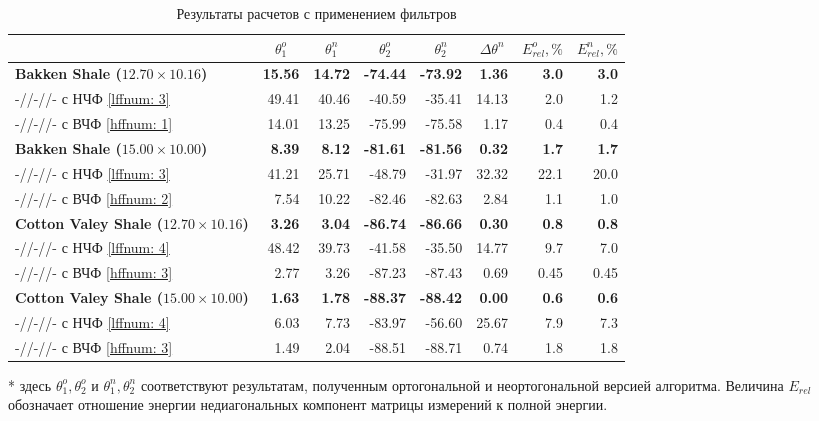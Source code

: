 \documentclass[a4paper,11pt]{article}
\begin{document}
\begin{table}[h]
\footnotesize
\centering
\caption{Результаты расчетов с применением фильтров}
\renewcommand{\arraystretch}{1.5}
\begin{tabularx}{\textwidth}{|X|rr|rr|r|rr|}
\hline
				&\multicolumn{1}{c}{$\theta_1^o$} & \multicolumn{1}{c|}{$\theta_1^n$} & \multicolumn{1}{c}{$\theta_2^o$} & \multicolumn{1}{c|}{$\theta_2^n$} & \multicolumn{1}{c|}{$\Delta\theta^n$}& \multicolumn{1}{c}{$E_{rel}^o, \%$} & \multicolumn{1}{c|}{$E_{rel}^n, \%$} \\ \hline
\hline	\textbf{Bakken Shale ($12.70 \times 10.16$)} & \textbf{15.56} & \textbf{14.72} & \textbf{-74.44}  & \textbf{-73.92}  & \textbf{1.36}  & \textbf{3.0} & \textbf{3.0} \\
		-//-//- с НЧФ \ref{lffnum: 3} & 49.41 & 40.46 & -40.59 & -35.41  & 14.13 & 2.0 & 1.2\\
		-//-//- с ВЧФ \ref{hffnum: 1} & 14.01 & 13.25 & -75.99 & -75.58  & 1.17 & 0.4 & 0.4\\
\hline	\textbf{Bakken Shale ($15.00 \times 10.00$)} & \textbf{8.39} & \textbf{8.12} & \textbf{-81.61}  & \textbf{-81.56} & \textbf{0.32}  & \textbf{1.7} & \textbf{1.7} \\
		-//-//- с НЧФ \ref{lffnum: 3} & 41.21 & 25.71 & -48.79 & -31.97  & 32.32 & 22.1 & 20.0\\
		-//-//- с ВЧФ \ref{hffnum: 2} & 7.54 & 10.22 & -82.46 & -82.63  & 2.84 & 1.1 & 1.0\\
\hline	\textbf{Cotton Valey Shale ($12.70 \times 10.16$)} & \textbf{3.26} & \textbf{3.04} & \textbf{-86.74}  & \textbf{-86.66}  & \textbf{0.30}  & \textbf{0.8} & \textbf{0.8}\\
		-//-//- с НЧФ \ref{lffnum: 4} & 48.42 & 39.73 & -41.58 & -35.50  & 14.77  & 9.7 & 7.0 \\
		-//-//- с ВЧФ \ref{hffnum: 3} & 2.77 & 3.26 & -87.23 & -87.43  & 0.69  & 0.45 & 0.45\\	
\hline	\textbf{Cotton Valey Shale ($15.00 \times 10.00$)} & \textbf{1.63} & \textbf{1.78} & \textbf{-88.37}  & \textbf{-88.42}  & \textbf{0.00}  & \textbf{0.6} & \textbf{0.6} \\
		-//-//- с НЧФ \ref{lffnum: 4} & 6.03 & 7.73 & -83.97 & -56.60  & 25.67  & 7.9 & 7.3 \\
		-//-//- с ВЧФ \ref{hffnum: 3} & 1.49 & 2.04 & -88.51 & -88.71  & 0.74  & 1.8 & 1.8\\		
\hline	
\end{tabularx} 
\begin{flushleft}
* здесь $\theta_1^o,\theta_2^o$ и $\theta_1^n,\theta_2^n$ соответствуют результатам, полученным ортогональной и неортогональной версией алгоритма. Величина $E_{rel}$ обозначает отношение энергии недиагональных компонент матрицы измерений к полной энергии.
\end{flushleft}
\label{tab:filter_process_results}
\renewcommand{\arraystretch}{1.0}
\end{table}
\end{document}
